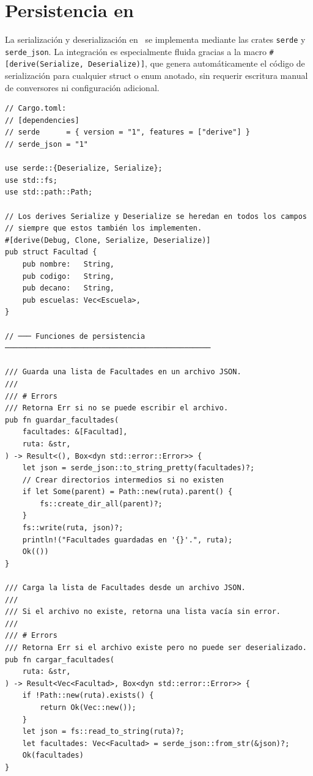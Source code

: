 \section{Persistencia en \rust}
\label{sec:rust-persistencia}

\noindent
La serialización y deserialización en \rust\ se implementa mediante las crates
\texttt{serde} y \texttt{serde\_json}. La integración es especialmente fluida gracias
a la macro \texttt{\#[derive(Serialize, Deserialize)]}, que genera automáticamente
el código de serialización para cualquier struct o enum anotado, sin requerir
escritura manual de conversores ni configuración adicional.

\begin{lstlisting}[style=rustStyle, caption={Persistencia con \texttt{serde} y \texttt{serde\_json}}, label={lst:serde}]
// Cargo.toml:
// [dependencies]
// serde      = { version = "1", features = ["derive"] }
// serde_json = "1"

use serde::{Deserialize, Serialize};
use std::fs;
use std::path::Path;

// Los derives Serialize y Deserialize se heredan en todos los campos
// siempre que estos también los implementen.
#[derive(Debug, Clone, Serialize, Deserialize)]
pub struct Facultad {
    pub nombre:   String,
    pub codigo:   String,
    pub decano:   String,
    pub escuelas: Vec<Escuela>,
}

// ─── Funciones de persistencia ───────────────────────────────────────────────

/// Guarda una lista de Facultades en un archivo JSON.
///
/// # Errors
/// Retorna Err si no se puede escribir el archivo.
pub fn guardar_facultades(
    facultades: &[Facultad],
    ruta: &str,
) -> Result<(), Box<dyn std::error::Error>> {
    let json = serde_json::to_string_pretty(facultades)?;
    // Crear directorios intermedios si no existen
    if let Some(parent) = Path::new(ruta).parent() {
        fs::create_dir_all(parent)?;
    }
    fs::write(ruta, json)?;
    println!("Facultades guardadas en '{}'.", ruta);
    Ok(())
}

/// Carga la lista de Facultades desde un archivo JSON.
///
/// Si el archivo no existe, retorna una lista vacía sin error.
///
/// # Errors
/// Retorna Err si el archivo existe pero no puede ser deserializado.
pub fn cargar_facultades(
    ruta: &str,
) -> Result<Vec<Facultad>, Box<dyn std::error::Error>> {
    if !Path::new(ruta).exists() {
        return Ok(Vec::new());
    }
    let json = fs::read_to_string(ruta)?;
    let facultades: Vec<Facultad> = serde_json::from_str(&json)?;
    Ok(facultades)
}


\end{lstlisting}
